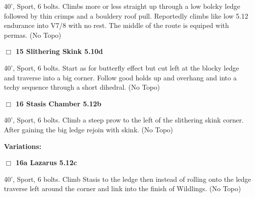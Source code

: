 \begin{multicols}{2}
\begin{adjustwidth}{1.3em}{}
40', Sport, 6 bolts. Climbs more or less straight up through a low bolcky ledge followed by thin crimps and a bouldery roof pull. Reportedly climbs like low 5.12 endurance into V7/8 with no rest. The middle of the route is equiped with permas.
  (No Topo)
\end{adjustwidth}




\needspace{2em}
\label{rt:Slithering Skink}
\colorbox{RoyalBlue!20}{
\parbox{0.95\linewidth}{
\hspace{-1ex}\textbf{$\Box$
15 Slithering Skink 5.10d  
}}}
\begin{adjustwidth}{1.3em}{}			

40', Sport, 6 bolts. Start as for butterfly effect but cut left at the blocky ledge and traverse into a big corner. Follow good holds up and overhang and into a techy sequence through a short dihedral.
  (No Topo)
\end{adjustwidth}




\needspace{2em}
\label{rt:Stasis Chamber}
\colorbox{Goldenrod!20}{
\parbox{0.95\linewidth}{
\hspace{-1ex}\textbf{$\Box$
16 Stasis Chamber 5.12b  
}}}
\begin{adjustwidth}{1.3em}{}			

40', Sport, 6 bolts. Climb a steep prow to the left of the slithering skink corner. After gaining the big ledge rejoin with skink.
  (No Topo)
\end{adjustwidth}


\begin{adjustwidth}{0.5cm}{}				
\needspace{4em}
\textbf{Variations:} \newline

\needspace{2em}
\label{vr:Lazarus}
\colorbox{Goldenrod!20}{
\parbox{0.95\linewidth}{
\hspace{-1ex}\textbf{$\Box$
16a Lazarus 5.12c  
}}}
\begin{adjustwidth}{1.3em}{}			

40', Sport, 6 bolts. Climb Stasis to the ledge then instead of rolling onto the ledge traverse left around the corner and link into the finish of Wildlings.
  (No Topo)
\end{adjustwidth}



\end{adjustwidth}



\end{multicols}
